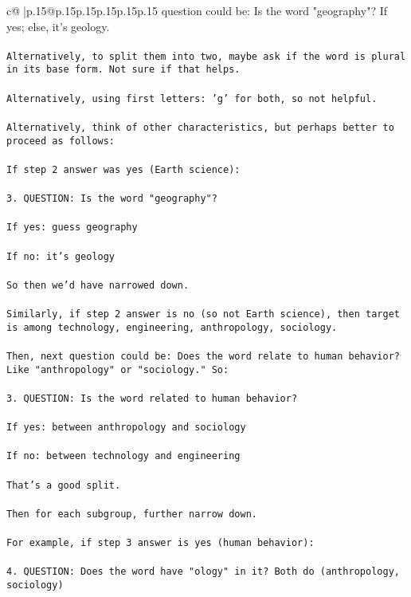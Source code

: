 \documentclass{article}
\begin{document}
{\begin{supertabular}{c@{$\;$}|p{.15\linewidth}@{}p{.15\linewidth}p{.15\linewidth}p{.15\linewidth}p{.15\linewidth}p{.15\linewidth}}
{{{question could be: Is the word "geography"? If yes; else, it's geology.\\ \tt \\ \tt Alternatively, to split them into two, maybe ask if the word is plural in its base form. Not sure if that helps.\\ \tt \\ \tt Alternatively, using first letters: 'g' for both, so not helpful.\\ \tt \\ \tt Alternatively, think of other characteristics, but perhaps better to proceed as follows:\\ \tt \\ \tt If step 2 answer was yes (Earth science):\\ \tt \\ \tt 3. QUESTION: Is the word "geography"?\\ \tt \\ \tt If yes: guess geography\\ \tt \\ \tt If no: it's geology\\ \tt \\ \tt So then we'd have narrowed down.\\ \tt \\ \tt Similarly, if step 2 answer is no (so not Earth science), then target is among technology, engineering, anthropology, sociology.\\ \tt \\ \tt Then, next question could be: Does the word relate to human behavior? Like "anthropology" or "sociology." So:\\ \tt \\ \tt 3. QUESTION: Is the word related to human behavior?\\ \tt \\ \tt If yes: between anthropology and sociology\\ \tt \\ \tt If no: between technology and engineering\\ \tt \\ \tt That's a good split.\\ \tt \\ \tt Then for each subgroup, further narrow down.\\ \tt \\ \tt For example, if step 3 answer is yes (human behavior):\\ \tt \\ \tt 4. QUESTION: Does the word have "ology" in it? Both do (anthropology, sociology)\\ }}}
\end{supertabular}}
\end{document}
